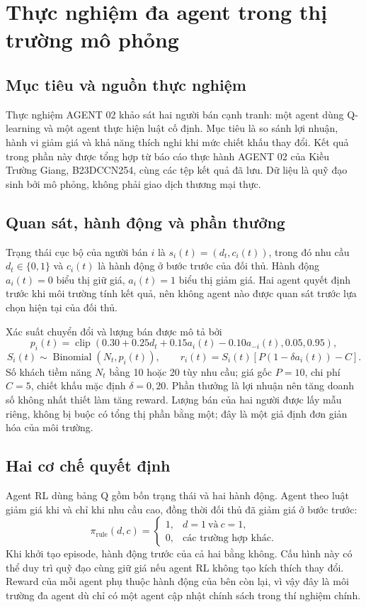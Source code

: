 \section{Thực nghiệm đa agent trong thị trường mô phỏng}
\subsection{Mục tiêu và nguồn thực nghiệm}
Thực nghiệm AGENT 02 khảo sát hai người bán cạnh tranh: một agent dùng Q-learning và một agent thực hiện luật cố định. Mục tiêu là so sánh lợi nhuận, hành vi giảm giá và khả năng thích nghi khi mức chiết khấu thay đổi. Kết quả trong phần này được tổng hợp từ báo cáo thực hành AGENT 02 của Kiều Trường Giang, B23DCCN254, cùng các tệp kết quả đã lưu. Dữ liệu là quỹ đạo sinh bởi mô phỏng, không phải giao dịch thương mại thực.

\subsection{Quan sát, hành động và phần thưởng}
Trạng thái cục bộ của người bán $i$ là $s_i(t)=(d_t,c_i(t))$, trong đó nhu cầu $d_t\in\{0,1\}$ và $c_i(t)$ là hành động ở bước trước của đối thủ. Hành động $a_i(t)=0$ biểu thị giữ giá, $a_i(t)=1$ biểu thị giảm giá. Hai agent quyết định trước khi môi trường tính kết quả, nên không agent nào được quan sát trước lựa chọn hiện tại của đối thủ.

Xác suất chuyển đổi và lượng bán được mô tả bởi
\[
p_i(t)=\operatorname{clip}\left(0.30+0.25d_t+0.15a_i(t)-0.10a_{-i}(t),0.05,0.95\right),
\]
\[
S_i(t)\sim\operatorname{Binomial}(N_t,p_i(t)),\qquad
r_i(t)=S_i(t)\left[P(1-\delta a_i(t))-C\right].
\]
Số khách tiềm năng $N_t$ bằng 10 hoặc 20 tùy nhu cầu; giá gốc $P=10$, chi phí $C=5$, chiết khấu mặc định $\delta=0,20$. Phần thưởng là lợi nhuận nên tăng doanh số không nhất thiết làm tăng reward. Lượng bán của hai người được lấy mẫu riêng, không bị buộc có tổng thị phần bằng một; đây là một giả định đơn giản hóa của môi trường.

\subsection{Hai cơ chế quyết định}
Agent RL dùng bảng Q gồm bốn trạng thái và hai hành động. Agent theo luật giảm giá khi và chỉ khi nhu cầu cao, đồng thời đối thủ đã giảm giá ở bước trước:
\[
\pi_{\mathrm{rule}}(d,c)=\begin{cases}1,&d=1\ \text{và}\ c=1,\\0,&\text{các trường hợp khác}.\end{cases}
\]
Khi khởi tạo episode, hành động trước của cả hai bằng không. Cấu hình này có thể duy trì quỹ đạo cùng giữ giá nếu agent RL không tạo kích thích thay đổi. Reward của mỗi agent phụ thuộc hành động của bên còn lại, vì vậy đây là môi trường đa agent dù chỉ có một agent cập nhật chính sách trong thí nghiệm chính.

